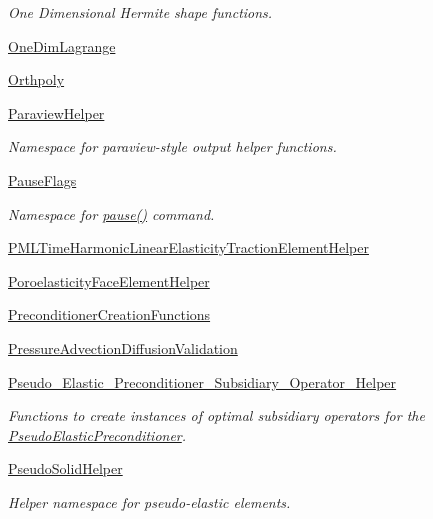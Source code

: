 \begin{DoxyCompactItemize}
\begin{DoxyCompactList}\small\item\em One Dimensional Hermite shape functions. \end{DoxyCompactList}\item 
 \hyperlink{namespaceoomph_1_1OneDimLagrange}{One\+Dim\+Lagrange}
\item 
 \hyperlink{namespaceoomph_1_1Orthpoly}{Orthpoly}
\item 
 \hyperlink{namespaceoomph_1_1ParaviewHelper}{Paraview\+Helper}
\begin{DoxyCompactList}\small\item\em Namespace for paraview-\/style output helper functions. \end{DoxyCompactList}\item 
 \hyperlink{namespaceoomph_1_1PauseFlags}{Pause\+Flags}
\begin{DoxyCompactList}\small\item\em Namespace for \hyperlink{namespaceoomph_a4a82243b0ce4c28469a290fe2d7cd2c4}{pause()} command. \end{DoxyCompactList}\item 
 \hyperlink{namespaceoomph_1_1PMLTimeHarmonicLinearElasticityTractionElementHelper}{P\+M\+L\+Time\+Harmonic\+Linear\+Elasticity\+Traction\+Element\+Helper}
\item 
 \hyperlink{namespaceoomph_1_1PoroelasticityFaceElementHelper}{Poroelasticity\+Face\+Element\+Helper}
\item 
 \hyperlink{namespaceoomph_1_1PreconditionerCreationFunctions}{Preconditioner\+Creation\+Functions}
\item 
 \hyperlink{namespaceoomph_1_1PressureAdvectionDiffusionValidation}{Pressure\+Advection\+Diffusion\+Validation}
\item 
 \hyperlink{namespaceoomph_1_1Pseudo__Elastic__Preconditioner__Subsidiary__Operator__Helper}{Pseudo\+\_\+\+Elastic\+\_\+\+Preconditioner\+\_\+\+Subsidiary\+\_\+\+Operator\+\_\+\+Helper}
\begin{DoxyCompactList}\small\item\em Functions to create instances of optimal subsidiary operators for the \hyperlink{classoomph_1_1PseudoElasticPreconditioner}{Pseudo\+Elastic\+Preconditioner}. \end{DoxyCompactList}\item 
 \hyperlink{namespaceoomph_1_1PseudoSolidHelper}{Pseudo\+Solid\+Helper}
\begin{DoxyCompactList}\small\item\em Helper namespace for pseudo-\/elastic elements. \end{DoxyCompactList}\item 

\end{DoxyCompactItemize}
